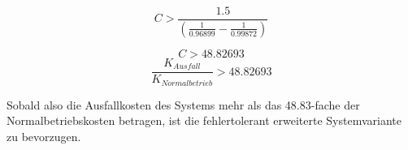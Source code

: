 \documentclass[a4paper]{article}
\begin{document}
\bigskip


\bigskip

\begin{equation*}
C>\frac{1.5}{(\frac{1}{0.96899}-\frac{1}{0.99872})}
\end{equation*}

\bigskip

\begin{equation*}
C>48.82693
\end{equation*}
\begin{equation*}
\frac{K_{\mathit{Ausfall}}}{K_{\mathit{Normalbetrieb}}}>48.82693
\end{equation*}

\bigskip

Sobald also die Ausfallkosten des Systems mehr als das 48.83-fache der
Normalbetriebskosten betragen, ist die fehlertolerant erweiterte
Systemvariante zu bevorzugen.


\bigskip
\end{document}

